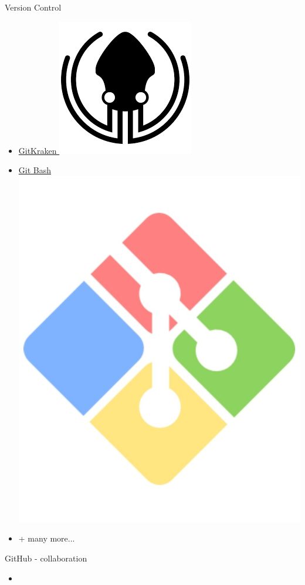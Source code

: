 \documentclass{beamer} %
\begin{document}
\begin{frame}{Version Control}
\begin{itemize}
      \item \href{https://www.gitkraken.com/}{GitKraken \includegraphics[height=.05\textheight]{gitkraken}}
      \item \href{https://gitforwindows.org/}{Git Bash \includegraphics[height=.07\textheight]{gitbash}}
      \item + many more...
    \end{itemize}
  \end{frame}

  \begin{frame}{GitHub - collaboration}
    \begin{itemize}
      \item 
    \end{itemize}
  \end{frame}
\end{document}
